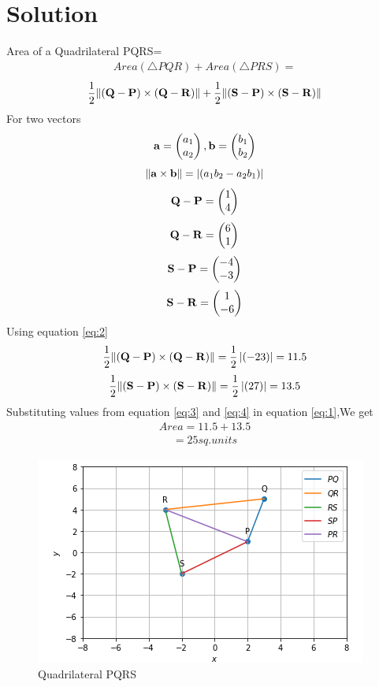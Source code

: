\documentclass[journal,12pt,twocolumn]{IEEEtran}
\begin{document}
\section*{\textbf{Solution}}
\noindent
Area of a Quadrilateral PQRS=
\begin{align}
Area (\triangle PQR)+ Area (\triangle PRS)=
\end{align}
\begin{equation}
\frac{1}{2}\lVert(\mathbf{Q}-\mathbf{P})\times(\mathbf{Q}-\mathbf{R})\rVert+\frac{1}{2}\lVert\mathbf{(\mathbf{S}-\mathbf{P})\times(\mathbf{S}-\mathbf{R})}\rVert
\label{eq:1}
\end{equation}
For two vectors
\begin{align}
\mathbf{a}=\begin{pmatrix}a_1\\a_2\end{pmatrix} , \mathbf{b}=\begin{pmatrix}b_1\\b_2\end{pmatrix}
\end{align}
\begin{equation}
\lVert\mathbf{\mathbf{a}\times\mathbf{b}}\rVert=\left\lvert(a_1b_2-a_2b_1)\right\rvert
\label{eq:2}
\end{equation}
\begin{align}
\mathbf{Q-P}=\begin{pmatrix}1\\4\end{pmatrix}
\end{align}
\begin{align}
\mathbf{Q-R}=\begin{pmatrix}6\\1\end{pmatrix}
\end{align}
\begin{align}
\mathbf{S-P}=\begin{pmatrix}-4\\-3\end{pmatrix}
\end{align}
\begin{align}
\mathbf{S-R}=\begin{pmatrix}1\\-6\end{pmatrix}
\end{align}
Using equation \eqref{eq:2}
\begin{equation}
\frac{1}{2}\lVert\mathbf{(\mathbf{Q}-\mathbf{P})\times(\mathbf{Q}-\mathbf{R})}\rVert
=\frac{1}{2}\left\lvert(-23)\right\rvert=11.5
\label{eq:3}
\end{equation}
\begin{equation}
\frac{1}{2}\lVert\mathbf{(\mathbf{S}-\mathbf{P})\times(\mathbf{S}-\mathbf{R})}\rVert
=\frac{1}{2}\left\lvert(27)\right\rvert=13.5    
\label{eq:4}
\end{equation}
Substituting values from equation \eqref{eq:3} and \eqref{eq:4} in equation \eqref{eq:1},We get
\begin{align}
Area =11.5+13.5
\end{align}
\begin{align}
=25 sq.units
\end{align}
\begin{figure}[!ht]
    \centering
    \includegraphics[width=\columnwidth]{QUAD.PNG}
    \caption{Quadrilateral PQRS}
    \label{fig:Quad PQRS}
\end{figure}
\end{document}
